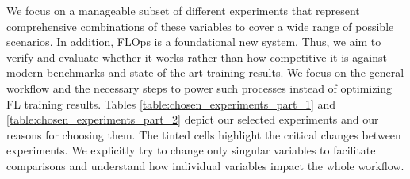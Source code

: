 We focus on a manageable subset of different experiments that represent comprehensive combinations of these variables to cover a wide range of possible scenarios.
In addition, FLOps is a foundational new system.
Thus, we aim to verify and evaluate whether it works rather than how competitive it is against modern benchmarks and state-of-the-art training results.
We focus on the general workflow and the necessary steps to power such processes instead of optimizing FL training results.
Tables \ref{table:chosen_experiments_part_1} and \ref{table:chosen_experiments_part_2} depict our selected experiments and our reasons for choosing them.
The tinted cells highlight the critical changes between experiments.
We explicitly try to change only singular variables to facilitate comparisons and understand how individual variables impact the whole workflow.

\begin{figure}[p]
    
\end{figure}

\begin{figure}[p]
    
\end{figure}